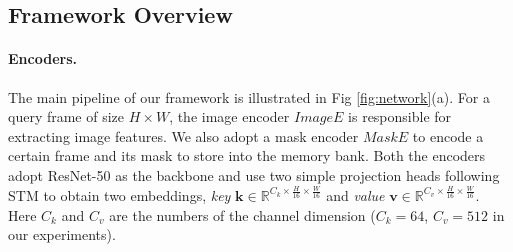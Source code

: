 \documentclass[10pt,twocolumn,letterpaper]{article}
\begin{document}
\subsection{Framework Overview}
\paragraph{Encoders.}
The main pipeline of our framework is illustrated in Fig \ref{fig:network}(a). For a query frame of size $H \times W$, the image encoder $ImageE$ is responsible for extracting image features. We also adopt a mask encoder $MaskE$ to encode a certain frame and its mask to store into the memory bank. Both the encoders adopt ResNet-50 \cite{he2016deep} as the backbone and use two simple projection heads following STM \cite{oh2019video} to obtain two embeddings, \textit{key} $\textbf{k}\in \mathbb{R}^{C_k \times \frac{H}{16} \times \frac{W}{16}}$ and \textit{value} $\textbf{v} \in \mathbb{R}^{C_v \times \frac{H}{16} \times \frac{W}{16}}$. Here $C_k$ and $C_v$ are the numbers of the channel dimension ($C_k=64$, $C_v=512$ in our experiments). 

\vspace{-0.5em}
\end{document}
